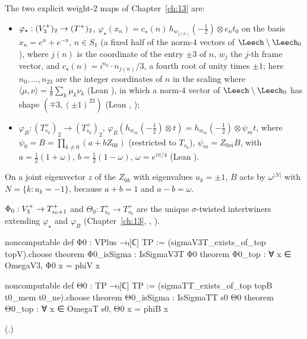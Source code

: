 The two explicit weight-$2$ maps of Chapter~\ref{ch:13} are:
\begin{itemize}
\item $\varphi_\star:(V_3^{+})_2\to(T^+)_2$, $\varphi_\star(x_n)=c_\star(n)\,h_{w_{j(n)}}(-\tfrac12)\otimes e_nt_0$
  on the basis $x_n=e^n+e^{-n}$, $n\in S_1$ (a fixed half of the norm-$4$ vectors of
  $\Leech\setminus\Leech_0$), where $j(n)$ is the coordinate of the entry $\pm3$ of $n$, $w_j$ the $j$-th frame
  vector, and $c_\star(n)=i^{n_0}\cdot n_{j(n)}/3$, a fourth root of unity times $\pm1$; here
  $n_0,\dots,n_{23}$ are the integer coordinates of $n$ in the scaling where
  $\langle\mu,\nu\rangle=\tfrac18\sum_k\mu_k\nu_k$ (Lean ), in which a norm-$4$ vector of
  $\Leech\setminus\Leech_0$ has shape $(\mp3,(\pm1)^{23})$ (Lean ,
  );
\item $\varphi_B:(T_{s_0}^+)_2\to(T_{s_0}^+)_2$, $\varphi_B(h_{w_m}(-\tfrac12)\otimes t)=h_{w_m}(-\tfrac12)\otimes\psi_mt$,
  where $\psi_0=B=\prod_{k\ne0}(a+bZ_{0k})$ (restricted to $T_{s_0}$), $\psi_m=Z_{0m}B$, with
  $a=\tfrac12(1+\omega)$, $b=\tfrac12(1-\omega)$, $\omega=e^{i\pi/4}$ (Lean ).
\end{itemize}
On a joint eigenvector $z$ of the $Z_{0k}$ with eigenvalues $u_k=\pm1$, $B$ acts by $\omega^{|N|}$ with
$N=\{k:u_k=-1\}$, because $a+b=1$ and $a-b=\omega$.

\begin{definition}\label{ch14:def:Phi0}
$\Phi_0:V_3^{+}\to T_{s_0+1}^+$ and $\Theta_0:T_{s_0}^+\to T_{s_0}^+$ are the unique $\sigma$-twisted
intertwiners extending $\varphi_\star$ and $\varphi_B$ (Chapter~\ref{ch:13}, ,
).
\end{definition}
\begin{leancode}
noncomputable def Φ0 : VPlus →ₗ[ℂ] TP := (sigmaV3T_exists_of_top topV).choose
theorem Φ0_isSigma : IsSigmaV3T Φ0
theorem Φ0_top : ∀ x ∈ OmegaV3, Φ0 x = phiV x

noncomputable def Θ0 : TP →ₗ[ℂ] TP := (sigmaTT_exists_of_top topB t0_mem t0_ne).choose
theorem Θ0_isSigma : IsSigmaTT s0 Θ0
theorem Θ0_top : ∀ x ∈ OmegaT s0, Θ0 x = phiB x
\end{leancode}
(.)


